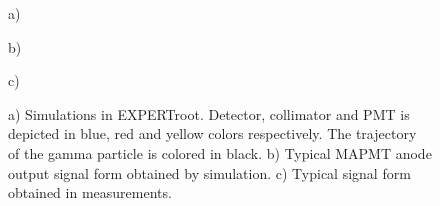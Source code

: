 \documentclass{webofc}
\newcommand{\er}{\textmd{EXPERTroot}}
\begin{document}
\begin{figure} 
	\begin{minipage}[h]{\linewidth} 
		 a) \\ 
	\end{minipage} 
	\vfill 
	\begin{minipage}[h]{0.47\linewidth} 
		 b) \\
	\end{minipage} 
	\hfill 
	\begin{minipage}[h]{0.47\linewidth} 
		 c) \\ 
	\end{minipage} 
	\caption{a) Simulations in \er. Detector, collimator and PMT is depicted in blue, red and yellow colors respectively. The trajectory of the gamma particle is colored in black. b) Typical MAPMT anode output signal form obtained by simulation. c) Typical signal form obtained in measurements.} 
	\label{ris:sim} 
\end{figure}
\end{document}
